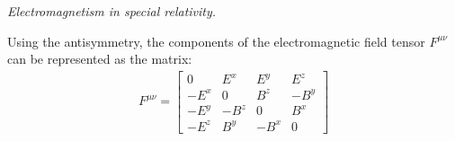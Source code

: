 \documentclass{report}
\begin{document}
\begin{subquests}
\begin{subquests}
		\item

		\item
	\end{subquests}
	
	\item \emph{Electromagnetism in special relativity.}
	\begin{subquests}
		\item
		Using the antisymmetry, the components of the electromagnetic field tensor $F^{\mu\nu}$	can be represented as the matrix:
		\begin{gather*}
			F^{\mu\nu} =
			\begin{bmatrix}
				0 & E^x & E^y & E^z \\
				-E^x & 0 & B^z & -B^y \\
				-E^y & -B^z & 0 & B^x \\
				-E^z & B^y & -B^x & 0
			\end{bmatrix}
		\end{gather*}
		

\end{subquests}
\end{subquests}
\end{document}
